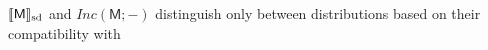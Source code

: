 \documentclass{article}
\DeclarePairedDelimiter{\SD}{\llbracket}{\rrbracket_{\text{sd}}}
\newcommand{\sfM}{\mathsf M}
\newcommand\inconsist{\mathit{Inc}}
\numberwithin{equation}{section}
\begin{document}
$\SD{\sfM}$ and $\inconsist(\sfM;-)$ distinguish only
        between distributions based on their compatibility with
% 
\end{document}
